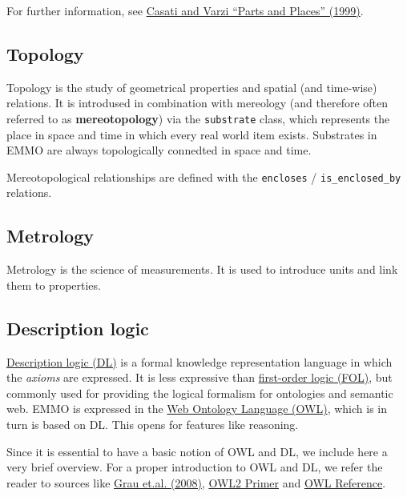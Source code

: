 \documentclass[a4paper,]{report}
\begin{document}
For further information, see
\href{https://mitpress.mit.edu/books/parts-and-places}{Casati and Varzi
``Parts and Places'' (1999)}.

\hypertarget{topology}{%
\subsection{Topology}\label{topology}}

Topology is the study of geometrical properties and spatial (and
time-wise) relations. It is introdused in combination with mereology
(and therefore often referred to as \textbf{mereotopology}) via the
\texttt{substrate} class, which represents the place in space and time
in which every real world item exists. Substrates in EMMO are always
topologically connedted in space and time.

Mereotopological relationships are defined with the \texttt{encloses} /
\texttt{is\_enclosed\_by} relations.

\hypertarget{metrology}{%
\subsection{Metrology}\label{metrology}}

Metrology is the science of measurements. It is used to introduce units
and link them to properties.

\hypertarget{description-logic}{%
\subsection{Description logic}\label{description-logic}}

\href{https://en.wikipedia.org/wiki/Description_logic}{Description logic
(DL)} is a formal knowledge representation language in which the
\emph{axioms} are expressed. It is less expressive than
\href{https://en.wikipedia.org/wiki/First-order_logic}{first-order logic
(FOL)}, but commonly used for providing the logical formalism for
ontologies and semantic web. EMMO is expressed in the
\href{https://en.wikipedia.org/wiki/Web_Ontology_Language}{Web Ontology
Language (OWL)}, which is in turn is based on DL. This opens for
features like reasoning.

Since it is essential to have a basic notion of OWL and DL, we include
here a very brief overview. For a proper introduction to OWL and DL, we
refer the reader to sources like
\href{http://www.cs.ox.ac.uk/boris.motik/pubs/ghmppss08next-steps.pdf}{Grau
et.al. (2008)}, \href{https://www.w3.org/TR/owl2-primer/}{OWL2 Primer}
and \href{https://www.w3.org/TR/owl-ref/}{OWL Reference}.
\end{document}
